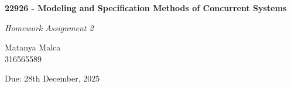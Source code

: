 \begin{center}
    \LARGE \textbf{22926 - Modeling and Specification Methods of Concurrent Systems} \par
    \vspace{1.5cm}

    \LARGE \textit{Homework Assignment 2} \par
    \vspace{1cm}

    \normalfont
    \large
    Matanya Malca\\
    316565589

    \vspace{0.5cm}

    Due: 28th December, 2025
\end{center}